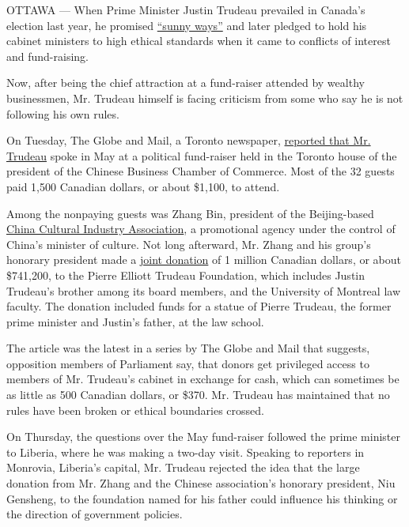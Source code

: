 OTTAWA --- When Prime Minister Justin Trudeau prevailed in Canada's
election last year, he promised
\href{http://www.nytimes.com/2015/10/20/world/americas/canada-election-stephen-harper-justin-trudeau.html}{``sunny
ways''} and later pledged to hold his cabinet ministers to high ethical
standards when it came to conflicts of interest and fund-raising.

Now, after being the chief attraction at a fund-raiser attended by
wealthy businessmen, Mr. Trudeau himself is facing criticism from some
who say he is not following his own rules.

On Tuesday, The Globe and Mail, a Toronto newspaper,
\href{http://www.theglobeandmail.com/news/politics/trudeau-attended-cash-for-access-fundraiser-with-chinese-billionaires/article32971362/}{reported
that Mr. Trudeau} spoke in May at a political fund-raiser held in the
Toronto house of the president of the Chinese Business Chamber of
Commerce. Most of the 32 guests paid 1,500 Canadian dollars, or about
\$1,100, to attend.

Among the nonpaying guests was Zhang Bin, president of the Beijing-based
\href{http://www.chncia.org/en/about.php?mid=1}{China Cultural Industry
Association}, a promotional agency under the control of China's minister
of culture. Not long afterward, Mr. Zhang and his group's honorary
president made a
\href{http://www.trudeaufoundation.ca/en/activities/news/200000-gift-explore-canada-china-relations}{joint
donation} of 1 million Canadian dollars, or about \$741,200, to the
Pierre Elliott Trudeau Foundation, which includes Justin Trudeau's
brother among its board members, and the University of Montreal law
faculty. The donation included funds for a statue of Pierre Trudeau, the
former prime minister and Justin's father, at the law school.

The article was the latest in a series by The Globe and Mail that
suggests, opposition members of Parliament say, that donors get
privileged access to members of Mr. Trudeau's cabinet in exchange for
cash, which can sometimes be as little as 500 Canadian dollars, or
\$370. Mr. Trudeau has maintained that no rules have been broken or
ethical boundaries crossed.

On Thursday, the questions over the May fund-raiser followed the prime
minister to Liberia, where he was making a two-day visit. Speaking to
reporters in Monrovia, Liberia's capital, Mr. Trudeau rejected the idea
that the large donation from Mr. Zhang and the Chinese association's
honorary president, Niu Gensheng, to the foundation named for his father
could influence his thinking or the direction of government policies.


